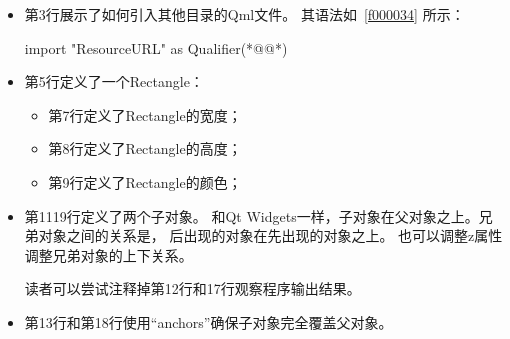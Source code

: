 \begin{itemize}

\item 第3行展示了如何引入其他目录的Qml文件。
其语法如\filesourcenumbernameone\ \ref{f000034}
所示：

\label{f000034}    %
\FloatBarrier                                  %
\begin{thebookfilesourceone}[escapeinside={(*@}{@*)},
caption=GoodLuck,
title=\filesourcenumbernameone \thefilesourcenumber
]
import "ResourceURL" as Qualifier(*@\marginpar[\hfill\setlength\fboxsep{2pt}\fbox{\footnotesize{\kaishu\parbox{1em}{\setlength{\baselineskip}{2pt}\filesourcenumbernameone}}\footnotesize{\thefilesourcenumber}}]{\setlength\fboxsep{2pt}\fbox{\footnotesize{\kaishu\parbox{1em}{\setlength{\baselineskip}{2pt}\filesourcenumbernameone}}\footnotesize{\thefilesourcenumber}}}@*)\end{thebookfilesourceone}          %
\addtocounter{lstlisting}{-1}   %

\item 第5行定义了一个Rectangle：


\begin{itemize}
\item 第7行定义了Rectangle的宽度；
\item 第8行定义了Rectangle的高度；
\item 第9行定义了Rectangle的颜色；
\end{itemize}

\item 第11\raisebox{0.16ex}{\sourcefonttwo\~{}}19行定义了两个子对象。
和Qt Widgets一样，子对象在父对象之上。兄弟对象之间的关系是，
后出现的对象在先出现的对象之上。
也可以调整z属性调整兄弟对象的上下关系。

读者可以尝试注释掉第12行和17行观察程序输出结果。


\item 第13行和第18行使用“anchors”确保子对象完全覆盖父对象。

\end{itemize}

